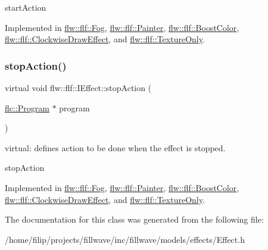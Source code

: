 start\+Action 

Implemented in \hyperlink{classflw_1_1flf_1_1Fog_a12acc2ae25d54721648265aa863c8b1e}{flw\+::flf\+::\+Fog}, \hyperlink{classflw_1_1flf_1_1Painter_aa5104b3f3db56f13d93172203f6fa105}{flw\+::flf\+::\+Painter}, \hyperlink{classflw_1_1flf_1_1BoostColor_a4bd0b925fea15ce7fc00296e3d2672e6}{flw\+::flf\+::\+Boost\+Color}, \hyperlink{classflw_1_1flf_1_1ClockwiseDrawEffect_a5d6c2f7e723f845f615572721f79a5a8}{flw\+::flf\+::\+Clockwise\+Draw\+Effect}, and \hyperlink{classflw_1_1flf_1_1TextureOnly_a5a04ae9211a3fb98df63166d3e009a5a}{flw\+::flf\+::\+Texture\+Only}.

\mbox{\label{classflw_1_1flf_1_1IEffect_a1a03eaf63a9d4edbd8764540d2d4133c}} 
\subsubsection{\texorpdfstring{stop\+Action()}{stopAction()}}
{\footnotesize\ttfamily virtual void flw\+::flf\+::\+I\+Effect\+::stop\+Action (\begin{DoxyParamCaption}\item[{\hyperlink{classflw_1_1flc_1_1Program}{flc\+::\+Program} $\ast$}]{program }\end{DoxyParamCaption})\hspace{0.3cm}{\ttfamily [pure virtual]}}



virtual\+: defines action to be done when the effect is stopped. 

stop\+Action 

Implemented in \hyperlink{classflw_1_1flf_1_1Fog_ab1b33ed568e679c51f24937db7ffd45c}{flw\+::flf\+::\+Fog}, \hyperlink{classflw_1_1flf_1_1Painter_a8ab637228dbefe1befaa92825507ad0e}{flw\+::flf\+::\+Painter}, \hyperlink{classflw_1_1flf_1_1BoostColor_a80c34ed26ed847e39fc036baad24e1d5}{flw\+::flf\+::\+Boost\+Color}, \hyperlink{classflw_1_1flf_1_1ClockwiseDrawEffect_a538235e072e91bfa16e185a535547679}{flw\+::flf\+::\+Clockwise\+Draw\+Effect}, and \hyperlink{classflw_1_1flf_1_1TextureOnly_ae23d8e028389fd4894135247574f976b}{flw\+::flf\+::\+Texture\+Only}.



The documentation for this class was generated from the following file\+:\begin{DoxyCompactItemize}
\item 
/home/filip/projects/fillwave/inc/fillwave/models/effects/Effect.\+h\end{DoxyCompactItemize}

